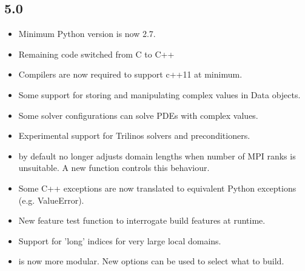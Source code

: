\subsection*{5.0}
\begin{itemize}
  \item Minimum Python version is now 2.7.
  \item Remaining code switched from C to C++
  \item Compilers are now required to support c++11 at minimum.
  \item Some support for storing and manipulating complex values in Data objects.
  \item Some solver configurations can solve PDEs with complex values.
  \item Experimental support for Trilinos solvers and preconditioners.
  \item \ripley by default no longer adjusts domain lengths when number of MPI ranks is unsuitable. A new function controls this behaviour.
  \item Some C++ exceptions are now translated to equivalent Python exceptions (e.g. ValueError).
  \item New \escript feature test function to interrogate build features at runtime.
  \item Support for 'long' indices for very large local domains.
  \item \escript is now more modular. New options can be used to select what to build.
\end{itemize}

